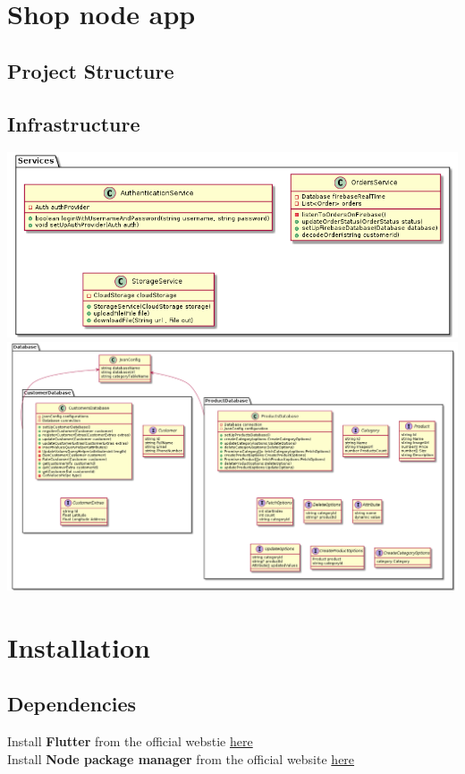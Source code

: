 \documentclass{article}
\begin{document}
\section{Shop node app}
\subsection{Project Structure}
\subsection{Infrastructure}
\includegraphics[scale=0.5]{./out/NodeApp/main/Services.png}
\includegraphics[scale=0.3]{./out/NodeApp/Database/Database.png}


\section{Installation}
\subsection{Dependencies}
Install \textbf{Flutter} from the official webstie \href{https://docs.flutter.dev/get-started/install}{here}\\
Install \textbf{Node package manager} from the official website \href{https://docs.npmjs.com/downloading-and-installing-node-js-and-npm}{here}\\
\end{document}
